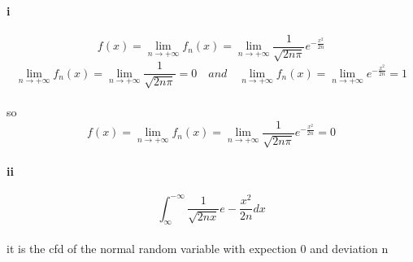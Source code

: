 \documentclass{article}
\begin{document}
\paragraph{i}
\begin{displaymath}
  f(x)=\lim_{n \to +\infty}f_{n}(x)=\lim_{n \to +\infty}\frac{1}{\sqrt{2n\pi}}e^{-\frac{x^{2}}{2n}}
\end{displaymath}
\begin{displaymath}
  \lim_{n \to +\infty}f_{n}(x)=\lim_{n \to +\infty}\frac{1}{\sqrt{2n\pi}}=0\quad and \quad\lim_{n \to +\infty}f_{n}(x)=\lim_{n \to +\infty}e^{-\frac{x^{2}}{2n}}=1
\end{displaymath}
\paragraph{}{so \begin{displaymath}
                  f(x)=\lim_{n \to +\infty}f_{n}(x)=\lim_{n \to +\infty}\frac{1}{\sqrt{2n\pi}}e^{-\frac{x^{2}}{2n}}=0
                \end{displaymath}}
\paragraph{ii}
\begin{displaymath}
  \int_{\infty}^{-\infty}\frac{1}{\sqrt{2nx}}e-\frac{x^{2}}{2n}dx
\end{displaymath}
\paragraph{}{it is the cfd of the normal random variable with expection 0 and deviation n}
\end{document}

